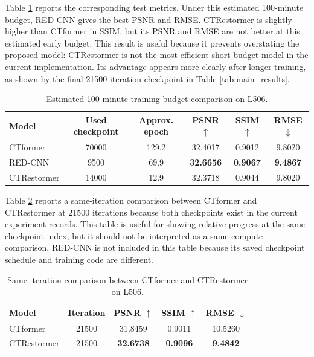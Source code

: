 Table \ref{tab:estimated_time_results} reports the corresponding test metrics. Under this estimated 100-minute budget, RED-CNN gives the best PSNR and RMSE. CTRestormer is slightly higher than CTformer in SSIM, but its PSNR and RMSE are not better at this estimated early budget. This result is useful because it prevents overstating the proposed model: CTRestormer is not the most efficient short-budget model in the current implementation. Its advantage appears more clearly after longer training, as shown by the final 21500-iteration checkpoint in Table \ref{tab:main_results}.

\begin{table}[!htbp]
    \centering
    \caption{Estimated 100-minute training-budget comparison on L506.}
    \renewcommand{\arraystretch}{1.25}
    \small
    \begin{tabular}{lccccc}
        \hline
        Model & Used checkpoint & Approx. epoch & PSNR \(\uparrow\) & SSIM \(\uparrow\) & RMSE \(\downarrow\) \\
        \hline
        CTformer & 70000 & 129.2 & 32.4017 & 0.9012 & 9.8020 \\
        \hline
        RED-CNN & 9500 & 69.9 & \textbf{32.6656} & \textbf{0.9067} & \textbf{9.4867} \\
        \hline
        CTRestormer & 14000 & 12.9 & 32.3718 & 0.9044 & 9.8020 \\
        \hline
    \end{tabular}
    \label{tab:estimated_time_results}
\end{table}

Table \ref{tab:same_iter} reports a same-iteration comparison between CTformer and CTRestormer at 21500 iterations because both checkpoints exist in the current experiment records. This table is useful for showing relative progress at the same checkpoint index, but it should not be interpreted as a same-compute comparison. RED-CNN is not included in this table because its saved checkpoint schedule and training code are different.

\begin{table}[!htbp]
    \centering
    \caption{Same-iteration comparison between CTformer and CTRestormer on L506.}
    \renewcommand{\arraystretch}{1.25}
    \small
    \begin{tabular}{lcccc}
        \hline
        Model & Iteration & PSNR \(\uparrow\) & SSIM \(\uparrow\) & RMSE \(\downarrow\) \\
        \hline
        CTformer & 21500 & 31.8459 & 0.9011 & 10.5260 \\
        \hline
        CTRestormer & 21500 & \textbf{32.6738} & \textbf{0.9096} & \textbf{9.4842} \\
        \hline
    \end{tabular}
    \label{tab:same_iter}
\end{table}

